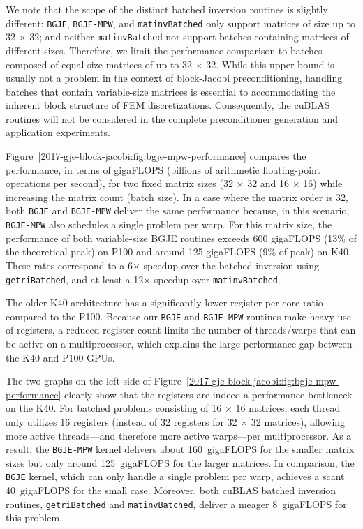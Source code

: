 We note that the scope of the distinct batched inversion routines is slightly
different: {\tt BGJE}, {\tt BGJE-MPW}, and {\tt matinvBatched} only support
matrices of size up to 32 $\times$ 32; and neither {\tt matinvBatched} nor
 support batches containing matrices of different
sizes. Therefore, we limit the performance comparison to batches composed of
equal-size matrices of up to 32 $\times$ 32. While this upper bound is usually
not a problem in the context of block-Jacobi preconditioning, handling batches
that contain variable-size matrices is essential to accommodating the inherent
block structure of FEM discretizations. Consequently, the cuBLAS routines will
not be considered in the complete preconditioner generation and application
experiments.

Figure~\ref{2017-gje-block-jacobi:fig:bgje-mpw-performance} compares the performance, in terms of
gigaFLOPS (billions of arithmetic floating-point operations per second), for two 
fixed matrix sizes (32 $\times$ 32 and 16 $\times$ 16) while increasing the matrix count (batch size).
In a case where the matrix order is 32, both {\tt BGJE} and {\tt BGJE-MPW} deliver the
same performance because, in this scenario, {\tt BGJE-MPW} also schedules a single
problem per warp. For this matrix size, the performance of both variable-size
BGJE routines exceeds 600 gigaFLOPS {(13\% of the theoretical peak)} on P100 and
around 125 gigaFLOPS {(9\% of peak)} on K40. These rates correspond to a 6$\times$
speedup over the batched inversion using {\tt getriBatched}, and at least a
12$\times$ speedup over {\tt matinvBatched}.

The older K40 architecture has a significantly lower register-per-core ratio
compared to the P100. Because our {\tt BGJE} and {\tt BGJE-MPW} routines make heavy
use of registers, a reduced register count limits the number of threads/warps
that can be active on a multiprocessor, which explains the large performance gap
between the K40 and P100 GPUs.

The two graphs on the left side of Figure~\ref{2017-gje-block-jacobi:fig:bgje-mpw-performance} clearly show 
that the registers are indeed a performance bottleneck on the K40. 
For batched problems consisting of 16 $\times$ 16 matrices, each thread only utilizes 
16 registers (instead of 32 registers for 32 $\times$ 32 matrices), allowing more active 
threads---and therefore more active warps---per
multiprocessor. As a result, the {\tt BGJE-MPW} kernel delivers about 160~gigaFLOPS
for the smaller matrix sizes but only around 125~gigaFLOPS for the larger matrices. In
comparison, the {\tt BGJE} kernel, which can only handle a single problem per
warp, achieves a scant 40~gigaFLOPS for the small case. Moreover, both cuBLAS
batched inversion routines, {\tt getriBatched} and {\tt matinvBatched}, deliver
a meager 8~gigaFLOPS for this problem.

